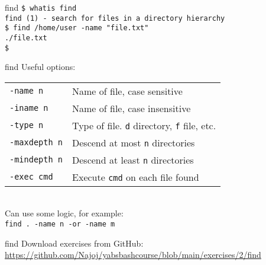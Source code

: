 \documentclass{beamer}
\let\tt\texttt
\begin{document}
\begin{frame}{find}
        \tt{\$ whatis find}\\
        \tt{find (1)  - search for files in a directory hierarchy}\\
        \tt{\$ find /home/user -name "file.txt"} \\
        \tt{./file.txt} \\
        \tt{\$ } \\
\end{frame}

\begin{frame}{find}
        Useful options:\\
        \begin{tabular}{| l | l}
                \hline
                \tt{-name n}     &   Name of file, case sensitive \\
                \tt{-iname n}    &   Name of file, case insensitive \\
                \tt{-type n}     &   Type of file. \tt{d} directory, \tt{f} file, etc. \\
                \tt{-maxdepth n} &   Descend at most \tt{n} directories \\
                \tt{-mindepth n} &   Descend at least \tt{n} directories \\
                \tt{-exec cmd }  &   Execute \tt{cmd} on each file found \\
                \hline
        \end{tabular} \\
        \medskip
        Can use some logic, for example: \\
        \tt{find . -name n -or -name m}
\end{frame}

\begin{frame}{find}
        Download exercises from GitHub: \\
        \url{https://github.com/Najoj/yabsbashcourse/blob/main/exercises/2/find}
\end{frame}
\end{document}
